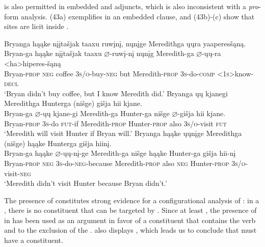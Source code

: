 \documentclass[output=paper]{LSP/langsci}
\begin{document}
 is also permitted in embedded  and adjuncts, which is also inconsistent with a \textit{pro}-form analysis. (43a) exemplifies  in an embedded clause, and (43b)-(c) show that  sites are licit inside  .

\ea\label{ex:jrs:43}
\ea
\glll Bryanga	hąąke	{n\k{i}\k{i}ta\v{s}jak taaxu}		ruw\k{i}n\k{i},		n\k{u}n\k{i}ge		Meredithga \k{u}\k{u}ra 	yaaperes\v{s}ąną. \\
Bryan-ga hąąke	{n\k{i}\k{i}ta\v{s}jak taaxu} $\varnothing$-ruw\k{i}-n\k{i} n\k{u}n\k{i}g	Meredith-ga $\varnothing$-\k{u}\k{u}-ra	<ha>hiperes-\v{s}ąną \\
Bryan-\textsc{prop}	\textsc{neg}	coffee	 \textsc{3s/o}-buy-\textsc{neg} but	 Meredith-\textsc{prop} \textsc{3s}-do-\textsc{comp}	\textsc{<1s>}know-\textsc{decl} \\
\trans `Bryan didn't buy coffee, but I know Meredith did.'
\ex 
\glll Bryanga	\k{u}\k{u}	kjanegi	Meredithga	Hunterga	(ni\v{s}ge)	 {gi\v{s}ja hii} kjane.\\
Bryan-ga	$\varnothing$-\k{u}\k{u}  kjane-gi	 Meredith-ga	Hunter-ga	ni\v{s}ge  {$\varnothing$-gi\v{s}ja hii} kjane. \\
Bryan-\textsc{prop} \textsc{3s}-do	\textsc{fut}-if	 Meredith-\textsc{prop} Hunter-\textsc{prop}	 also	 \textsc{3s/o}-visit	 \textsc{fut} \\
\trans `Meredith will visit Hunter if Bryan will.'
\ex 
\glll Bryanga			hąąke	\k{u}\k{u}n\k{i}ge	Meredithga		(ni\v{s}ge)		hąąke Hunterga	{gi\v{s}ja hiin\k{i}.}\\
Bryan-ga	hąąke	$\varnothing$-\k{u}\k{u}-n\k{i}-ge	Meredith-ga	 ni\v{s}ge	hąąke  Hunter-ga  {gi\v{s}ja hii-n\k{i}} \\
Bryan-\textsc{prop}	\textsc{neg}	\textsc{3s}-do-\textsc{neg}-because Meredith-\textsc{prop} also	\textsc{neg} Hunter-\textsc{prop} \textsc{3s/o}-visit-\textsc{neg} \\
\trans `Meredith didn't visit Hunter because Bryan didn't.'
\z
\z

The presence of  constitutes strong evidence for a configurational analysis of : in a , there is no  constituent that can be targeted by . Since at least \citet{Ross1969}, the presence of  in  has been used as an argument in favor of a  constituent that contains the verb and  to the exclusion of the .  also displays , which leads us to conclude that  must have a  constituent.
\end{document}
